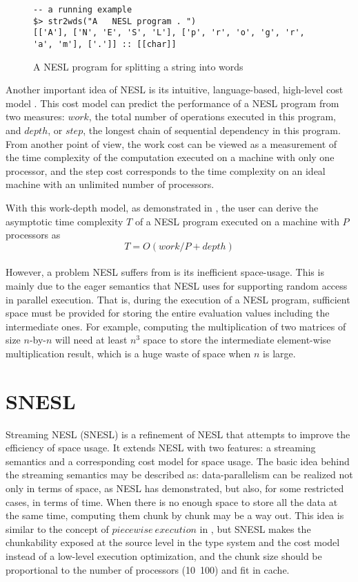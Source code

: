 \begin{figure}[H]
 
\begin{lstlisting}[style=nesl-style]
-- a running example
$> str2wds("A   NESL program . ")
[['A'], ['N', 'E', 'S', 'L'], ['p', 'r', 'o', 'g', 'r', 'a', 'm'], ['.']] :: [[char]]
\end{lstlisting}
\caption{{A NESL program for splitting a string into words \label{fig-nesl-wordpart}}}
\end{figure}


Another important idea of NESL is its intuitive, language-based, high-level cost model \cite{blel96cost}.
This cost model can predict the performance of a NESL program from two measures: $work$, the total number of operations executed in this program, and $depth$, or $step$, the longest chain of sequential dependency in this program.
From another point of view, the work cost can be viewed as a measurement of the time complexity of the computation executed on a machine with only one processor,
and the step cost corresponds to the time complexity on an ideal machine with an unlimited number of processors. 

With this work-depth model, as demonstrated in \cite{Blel90vecmod},   the user can derive the asymptotic time complexity $T$ of a NESL program executed on a machine with $P$ processors as 
$$ T = O(work/P + depth) $$ \\


However, a problem NESL suffers from is its inefficient space-usage.
This is mainly due to the eager semantics that NESL uses for supporting random access in parallel execution.
That is, during the execution of a NESL program, sufficient space must be provided for storing the entire evaluation values including the intermediate ones.
For example, computing the multiplication of two matrices of size $n$-by-$n$ will need at least $n^3$ space to store the intermediate element-wise multiplication result, which is a huge waste of space when $n$ is large.

\section{SNESL}
Streaming NESL (SNESL) \cite{MadFil13} is a refinement of NESL
that attempts to improve the efficiency of space usage. 
It extends NESL with two features: a streaming semantics and a corresponding cost model for space usage. 
The basic idea behind the streaming semantics may be described as:
data-parallelism can be realized not only in terms of space, as NESL has demonstrated, but also, for some restricted cases, in terms of time. 
When there is no enough space to store all the data at the same time, computing them chunk by chunk may be a way out.
This idea is similar to the concept of $piecewise \ execution$ in \cite{palm95}, but SNESL makes the chunkability exposed at the source level in the type system and the cost model instead of a low-level execution optimization, and the chunk size should be  proportional to the number of processors (10~100) and fit in cache.

